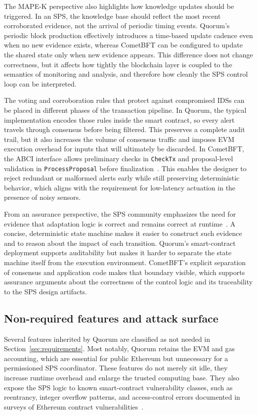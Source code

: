 The MAPE-K perspective also highlights how knowledge updates should be triggered. In an SPS, the knowledge base should reflect the most recent corroborated evidence, not the arrival of periodic timing events. Quorum's periodic block production effectively introduces a time-based update cadence even when no new evidence exists, whereas CometBFT can be configured to update the shared state only when new evidence appears. This difference does not change correctness, but it affects how tightly the blockchain layer is coupled to the semantics of monitoring and analysis, and therefore how cleanly the SPS control loop can be interpreted.

The voting and corroboration rules that protect against compromised IDSs can be placed in different phases of the transaction pipeline. In Quorum, the typical implementation encodes those rules inside the smart contract, so every alert travels through consensus before being filtered. This preserves a complete audit trail, but it also increases the volume of consensus traffic and imposes EVM execution overhead for inputs that will ultimately be discarded. In CometBFT, the ABCI interface allows preliminary checks in \texttt{CheckTx} and proposal-level validation in \texttt{ProcessProposal} before finalization~\cite{abciOverview}. This enables the designer to reject redundant or malformed alerts early while still preserving deterministic behavior, which aligns with the requirement for low-latency actuation in the presence of noisy sensors.

From an assurance perspective, the SPS community emphasizes the need for evidence that adaptation logic is correct and remains correct at runtime~\cite{calinescu2017engineering, pekaric2023systematic}. A concise, deterministic state machine makes it easier to construct such evidence and to reason about the impact of each transition. Quorum's smart-contract deployment supports auditability but makes it harder to separate the state machine itself from the execution environment. CometBFT's explicit separation of consensus and application code makes that boundary visible, which supports assurance arguments about the correctness of the control logic and its traceability to the SPS design artifacts.

\subsection{Non-required features and attack surface}
Several features inherited by Quorum are classified as not needed in Section~\ref{sec:requirements}. Most notably, Quorum retains the EVM and gas accounting, which are essential for public Ethereum but unnecessary for a permissioned SPS coordinator. These features do not merely sit idle, they increase runtime overhead and enlarge the trusted computing base. They also expose the SPS logic to known smart-contract vulnerability classes, such as reentrancy, integer overflow patterns, and access-control errors documented in surveys of Ethereum contract vulnerabilities~\cite{atzei2017survey, kushwaha2022systematic}.

